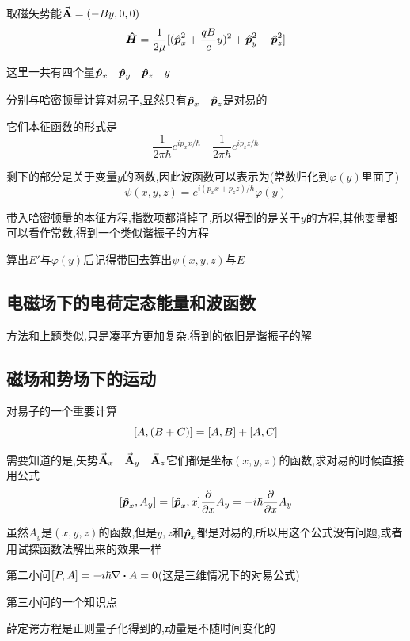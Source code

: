 \documentclass{article}
\begin{document}
            取磁矢势能$\va{A} = (-By,0,0)$
            $$ \vu*{H} = \frac{1}{2\mu} [(\vu*{p}_{x}^{2} + \frac{qB}{c} y)^{2} + \vu*{p}_{y}^{2} + \vu*{p}_{z}^{2} ] $$

            这里一共有四个量$\vu*{p}_{x} \quad \vu*{p}_{y} \quad \vu*{p}_{z} \quad y $

            分别与哈密顿量计算对易子,显然只有$\vu*{p}_{x} \quad \vu*{p}_{z}$是对易的

            它们本征函数的形式是
            $$ \frac{1}{2\pi \hbar} e^{ip_{x}x/\hbar} \quad \frac{1}{2\pi \hbar} e^{ip_{z}z / \hbar} $$

            剩下的部分是关于变量$y$的函数,因此波函数可以表示为(常数归化到$\varphi(y)$里面了)
            $$ \psi(x,y,z) = e^{i(p_{x}x+p_{z}z)/\hbar} \varphi(y) $$

            带入哈密顿量的本征方程,指数项都消掉了,所以得到的是关于$y$的方程,其他变量都可以看作常数,得到一个类似谐振子的方程
            
            算出$E'$与$\varphi(y)$后记得带回去算出$\psi(x,y,z)$与$E$


        \subsection{电磁场下的电荷定态能量和波函数}
            方法和上题类似,只是凑平方更加复杂.得到的依旧是谐振子的解

        \subsection{磁场和势场下的运动}
            \begin{formal}
                对易子的一个重要计算
                    $$ \comm{A}{(B+C)} = \comm{A}{B} + \comm{A}{C} $$
            \end{formal}
        
            需要知道的是,矢势$\va{A}_{x} \quad \va{A}_{y} \quad \va{A}_{z}$它们都是坐标$(x,y,z)$的函数,求对易的时候直接用公式
            $$ \comm{\vu*{p}_{x}}{A_{y}}  =  \comm{\vu*{p}_{x}}{x} \pdv{x} A_{y} =  - i \hbar \pdv{x} A_{y} $$

            虽然$A_{y}$是$(x,y,z)$的函数,但是$y,z$和$\vu*{p}_{x}$都是对易的,所以用这个公式没有问题,或者用试探函数法解出来的效果一样

            第二小问$\comm{P}{A} = -i\hbar \nabla \vdot A = 0$(这是三维情况下的对易公式)

            第三小问的一个知识点

            \begin{formal}
                薛定谔方程是正则量子化得到的,动量是不随时间变化的
            \end{formal}
\end{document}
